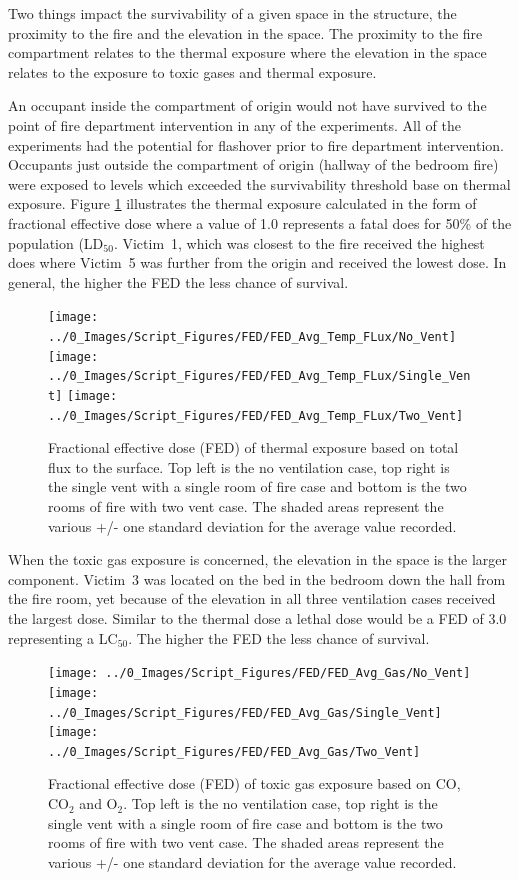\documentclass[12pt,oneside]{book}
\begin{document}
Two things impact the survivability of a given space in the structure, the proximity to the fire and the elevation in the space. The proximity to the fire compartment relates to the thermal exposure where the elevation in the space relates to the exposure to toxic gases and thermal exposure. 

An occupant inside the compartment of origin would not have survived to the point of fire department intervention in any of the experiments. All of the experiments had the potential for flashover prior to fire department intervention. Occupants just outside the compartment of origin (hallway of the bedroom fire) were exposed to levels which exceeded the survivability threshold base on thermal exposure. Figure \ref{fig:FED_heat_TC} illustrates the thermal exposure calculated in the form of fractional effective dose where a value of 1.0 represents a fatal does for 50\% of the population (LD$_{50}$. Victim~1, which was closest to the fire received the highest does where Victim~5 was further from the origin and received the lowest dose. In general, the higher the FED the less chance of survival. 

\begin{figure}[H]
\centering
\texttt{[image: ../0\_Images/Script\_Figures/FED/FED\_Avg\_Temp\_FLux/No\_Vent]}
\texttt{[image: ../0\_Images/Script\_Figures/FED/FED\_Avg\_Temp\_FLux/Single\_Vent]}
\texttt{[image: ../0\_Images/Script\_Figures/FED/FED\_Avg\_Temp\_FLux/Two\_Vent]}
\caption[Thermal Exposure Total Flux - Three Ventilation Configurations]{Fractional effective dose (FED) of thermal exposure based on total flux to the surface. Top left is the no ventilation case, top right is the single vent with a single room of fire case and bottom is the two rooms of fire with two vent case. The shaded areas represent the various +/- one standard deviation for the average value recorded.}
\label{fig:FED_heat_TC}
\end{figure}

When the toxic gas exposure is concerned, the elevation in the space is the larger component. Victim~3 was located on the bed in the bedroom down the hall from the fire room, yet because of the elevation in all three ventilation cases received the largest dose. Similar to the thermal dose a lethal dose would be a FED of 3.0 representing a LC$_{50}$. The higher the FED the less chance of survival. 

\begin{figure}[H]
\centering
\texttt{[image: ../0\_Images/Script\_Figures/FED/FED\_Avg\_Gas/No\_Vent]}
\texttt{[image: ../0\_Images/Script\_Figures/FED/FED\_Avg\_Gas/Single\_Vent]}
\texttt{[image: ../0\_Images/Script\_Figures/FED/FED\_Avg\_Gas/Two\_Vent]}
\caption[Toxic Gas Exposure - Three Ventilation Configurations]{Fractional effective dose (FED) of toxic gas exposure based on CO, CO$_2$ and O$_2$. Top left is the no ventilation case, top right is the single vent with a single room of fire case and bottom is the two rooms of fire with two vent case. The shaded areas represent the various +/- one standard deviation for the average value recorded.}
\label{fig:FED_gas_TC}
\end{figure}
\end{document}
